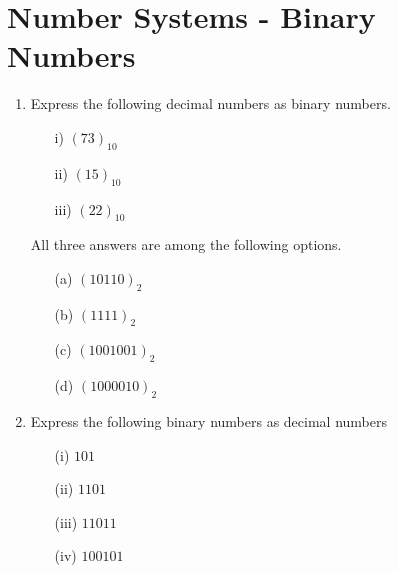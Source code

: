 \documentclass[]{report}
\begin{document}
\large
\section*{Number Systems - Binary Numbers}
\begin{enumerate}
\item Express the following decimal numbers as binary numbers.
  \begin{multicols}{4}
    \begin{itemize}
    \item[i)] $(73)_{10}$
    \item[ii)] $(15)_{10}$
    \item[iii)] $(22)_{10}$
    \end{itemize}
  \end{multicols}

  All three answers are among the following options.
  \begin{multicols}{4}
    \begin{itemize}
    \item[(a)] $(10110)_{2}$ %
    \item[(b)] $(1111)_{2}$ %
    \item[(c)] $(1001001)_{2}$ %
    \item[(d)] $(1000010)_{2}$ %
    \end{itemize}
  \end{multicols}
	\item Express the following binary numbers as decimal numbers
	\begin{multicols}{2}
		\begin{itemize}
			\item[(i)] $101$
			\item[(ii)] $1101$
			\item[(iii)] $11011$
			\item[(iv)] $100101$
		\end{itemize}
	\end{multicols}



\end{enumerate}
\end{document}
